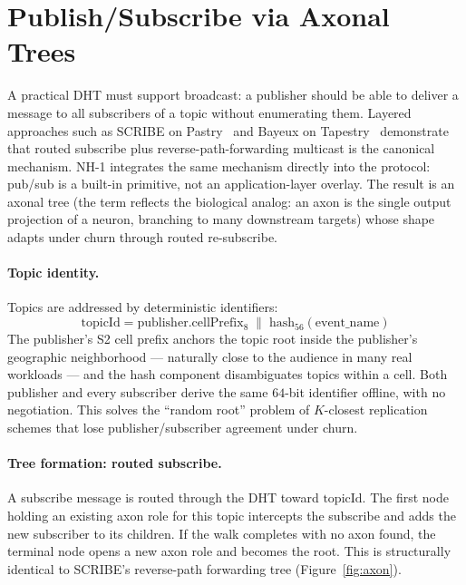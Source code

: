 \documentclass[conference]{IEEEtran}
\newcommand{\nhone}{NH-1\xspace}
\begin{document}
\section{Publish/Subscribe via Axonal Trees}
\label{sec:pubsub}

A practical DHT must support broadcast: a publisher should be able to
deliver a message to all subscribers of a topic without enumerating them.
Layered approaches such as SCRIBE on Pastry~\cite{castro2002scribe} and
Bayeux on Tapestry~\cite{zhuang2001bayeux} demonstrate that routed
subscribe plus reverse-path-forwarding multicast is the canonical
mechanism. \nhone integrates the same mechanism directly into the
protocol: pub/sub is a built-in primitive, not an application-layer
overlay. The result is an axonal tree (the term reflects the biological
analog: an axon is the single output projection of a neuron, branching
to many downstream targets) whose shape adapts under churn through
routed re-subscribe.

\paragraph{Topic identity.}
Topics are addressed by deterministic identifiers:
\[
\mathrm{topicId} = \mathrm{publisher}.\mathrm{cellPrefix}_{8} \;\|\; \mathrm{hash}_{56}(\mathrm{event\_name})
\]
The publisher's S2 cell prefix anchors the topic root inside the
publisher's geographic neighborhood --- naturally close to the audience
in many real workloads --- and the hash component disambiguates topics
within a cell. Both publisher and every subscriber derive the same
$64$-bit identifier offline, with no negotiation. This solves the
``random root'' problem of $K$-closest replication schemes that lose
publisher/subscriber agreement under churn.

\paragraph{Tree formation: routed subscribe.}
A subscribe message is routed through the DHT toward
$\mathrm{topicId}$. The first node holding an existing axon role for
this topic intercepts the subscribe and adds the new subscriber to its
children. If the walk completes with no axon found, the terminal node
opens a new axon role and becomes the root. This is structurally
identical to SCRIBE's reverse-path forwarding tree
(Figure~\ref{fig:axon}).
\end{document}
